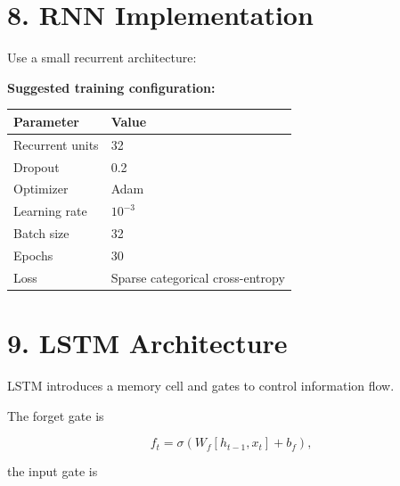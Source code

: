 \documentclass[10pt]{article}
\begin{document}
\section*{8. RNN Implementation}

Use a small recurrent architecture:

\begin{center}
\end{center}

\textbf{Suggested training configuration:}

\begin{center}
\begin{tabular}{|l|l|}
\hline
Parameter & Value\\
\hline
Recurrent units & 32\\
Dropout & 0.2\\
Optimizer & Adam\\
Learning rate & $10^{-3}$\\
Batch size & 32\\
Epochs & 30\\
Loss & Sparse categorical cross-entropy\\
\hline
\end{tabular}
\end{center}

\section*{9. LSTM Architecture}

LSTM introduces a memory cell and gates to control information flow.

The forget gate is

\[
f_t=\sigma(W_f[h_{t-1},x_t]+b_f),
\]

the input gate is
\end{document}
